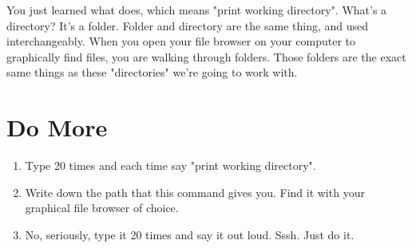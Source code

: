 You just learned what  does, which means "print working
directory".  What's a directory?  It's a folder.  Folder and directory are the
same thing, and used interchangeably.  When you open your file browser on your
computer to graphically find files, you are walking through folders.  Those
folders are the exact same things as these "directories" we're going to work
with.

\section{Do More}

\begin{enumerate}
\item Type  20 times and each time say "print working directory".
\item Write down the path that this command gives you.  Find it with your 
    graphical file browser of choice.
\item No, seriously, type it 20 times and say it out loud.  Sssh.  Just do it.
\end{enumerate}

